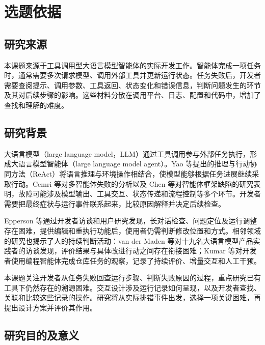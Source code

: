 \label{chap:selection-report}

\section{选题依据}

\subsection{研究来源}

本课题来源于工具调用型大语言模型智能体的实际开发工作。智能体完成一项任务时，通常需要多次请求模型、调用外部工具并更新运行状态。任务失败后，开发者需要查阅提示、调用参数、工具返回、状态变化和错误信息，判断问题发生的环节及其对后续步骤的影响。这些材料分散在调用平台、日志、配置和代码中，增加了查找和理解的难度。

\subsection{研究背景}

大语言模型（large language model，LLM）通过工具调用参与外部任务执行，形成大语言模型智能体（large language model agent）。Yao 等\cite{yao2023react}提出的推理与行动协同方法（ReAct）将语言推理与环境操作相结合，使模型能够根据任务进展继续采取行动。Cemri 等\cite{cemri2025mast}对多智能体失败的分析以及 Chen 等\cite{ref20}对智能体框架缺陷的研究表明，故障可能涉及模型输出、工具交互、状态传递和流程控制等多个环节。开发者需要把最终症状与运行事件联系起来，比较原因解释并决定后续检查。

Epperson 等\cite{ref02}通过开发者访谈和用户研究发现，长对话检查、问题定位及运行调整存在困难，提供编辑和重执行功能后，使用者仍需判断修改位置和方式。相邻领域的研究也揭示了人的持续判断活动：van der Maden 等\cite{ref01}对十九名大语言模型产品实践者的访谈发现，评价结果与具体改进行动之间存在衔接困难；Kumar 等\cite{ref59}对开发者使用编程智能体完成仓库任务的观察，记录了持续评价、增量交互和人工干预。

本课题关注开发者从任务失败回查运行步骤、判断失败原因的过程，重点研究已有工具下仍然存在的溯源困难。交互设计涉及运行记录如何呈现，以及开发者查找、关联和比较这些记录的操作。研究将从实际排错事件出发，选择一项关键困难，再提出设计方案并评价其作用。

\subsection{研究目的及意义}


